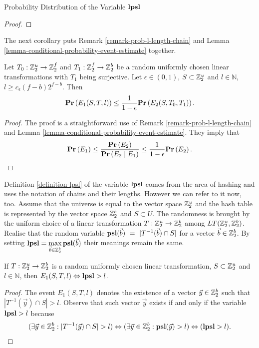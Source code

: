 \begin{section}{Probability Distribution of the Variable \texorpdfstring{$\mathbf{lpsl}$}{lpsl}}
\begin{proof}
\end{proof}

The next corollary puts Remark \ref{remark-prob-l-length-chain} and Lemma \ref{lemma-conditional-probability-event-estimate} together.
\begin{corollary}
\label{corollary-prob-e2-e1}
Let $T_0: \mathbb{Z}_{2}^{u} \rightarrow \mathbb{Z}_{2}^{f}$ and $T_1: \mathbb{Z}_{2}^{f} \rightarrow \mathbb{Z}_{2}^{b}$ be a random uniformly chosen linear transformations with $T_1$ being surjective. Let $\epsilon \in (0, 1)$, $S \subset \mathbb{Z}_{2}^{u}$ and $l \in \mathbb{N}$, $l \geq c_{\epsilon}(f - b)2 ^ {f - b}$. Then
\[
	\mathbf{Pr}\left(E_1(S, T, l)\right) \leq \frac{1}{1 - \epsilon} \mathbf{Pr}\left(E_2(S, T_0, T_1)\right) \text{.}
\]
\end{corollary}
\begin{proof}
The proof is a straightforward use of Remark \ref{remark-prob-l-length-chain} and Lemma \ref{lemma-conditional-probability-event-estimate}. They imply that
\[
	\mathbf{Pr}\left(E_1\right) \leq \frac{\mathbf{Pr}\left(E_2\right)}{\mathbf{Pr}\left(E_2 \mid E_1\right)} \leq \frac{1}{1 - \epsilon}\mathbf{Pr}\left(E_2\right) \text{.}
\]
\end{proof}

Definition \ref{definition-lpsl} of the variable $\mathbf{lpsl}$ comes from the area of hashing and uses the notation of chains and their lengths. However we can refer to it now, too. Assume that the universe is equal to the vector space $\mathbb{Z}_{2}^{u}$ and the hash table is represented by the vector space $\mathbb{Z}_{2}^{b}$ and $S \subset U$. The randomness is brought by the uniform choice of a linear transformation $T: \mathbb{Z}_{2}^{u} \rightarrow \mathbb{Z}_{2}^{b}$ among $LT(\mathbb{Z}_{2}^{u}, \mathbb{Z}_{2}^{b})$. Realise that the random variable $\mathbf{psl}(\vec{b})~=~|T^{-1}(\vec{b}) \cap S|$ for a vector $\vec{b} \in \mathbb{Z}_{2}^{b}$. By setting $\mathbf{lpsl} = \displaystyle\max_{\vec{b} \in \mathbb{Z}_{2}^{b}} \mathbf{psl}(\vec{b})$ their meanings remain the same. 

\begin{lemma}
\label{lemma-e1-lpsl-equivalence}
If $T: \mathbb{Z}_{2}^{u} \rightarrow \mathbb{Z}_{2}^{b}$ is a random uniformly chosen linear transformation, $S \subset \mathbb{Z}_{2}^{u}$ and $l \in \mathbb{N}$, then $E_1(S, T, l) \Leftrightarrow \mathbf{lpsl} > l$.
\end{lemma}
\begin{proof}
The event $E_1(S, T, l)$ denotes the existence of a vector $\vec{y} \in \mathbb{Z}_{2}^{b}$ such that $|T^{-1}(\vec{y}) \cap S| > l$. Observe that such vector $\vec{y}$ exists if and only if the variable $\mathbf{lpsl} > l$ because
\[
(\exists \vec{y} \in \mathbb{Z}_{2}^{b}: |T^{-1}(\vec{y}) \cap S| > l) \Leftrightarrow (\exists \vec{y} \in \mathbb{Z}_{2}^{b}: \mathbf{psl}(\vec{y}) > l) \Leftrightarrow (\mathbf{lpsl} > l) \text{.}
\] 
\end{proof}


\end{section}
